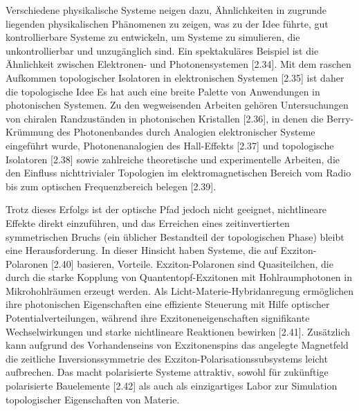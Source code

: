 \documentclass[
aps,
prl,
groupedaddress,
superscriptaddress,
floatfix,
notitlepage
]{revtex4-1}
\begin{document}
Verschiedene physikalische Systeme neigen dazu, Ähnlichkeiten in zugrunde liegenden physikalischen Phänomenen zu zeigen, was zu der Idee führte, gut kontrollierbare Systeme zu entwickeln, um Systeme zu simulieren, die unkontrollierbar und unzugänglich sind.
Ein spektakuläres Beispiel ist die Ähnlichkeit zwischen Elektronen- und Photonensystemen [2.34].
Mit dem raschen Aufkommen topologischer Isolatoren in elektronischen Systemen [2.35] ist daher die topologische Idee
Es hat auch eine breite Palette von Anwendungen in photonischen Systemen. Zu den wegweisenden Arbeiten gehören
Untersuchungen von chiralen Randzuständen in photonischen Kristallen [2.36], in denen die Berry-Krümmung des Photonenbandes durch Analogien elektronischer Systeme eingeführt wurde, Photonenanalogien des Hall-Effekts [2.37] und topologische Isolatoren [2.38] sowie zahlreiche theoretische und experimentelle Arbeiten, die den Einfluss nichttrivialer Topologien im elektromagnetischen Bereich vom Radio bis zum optischen Frequenzbereich belegen [2.39].

Trotz dieses Erfolgs ist der optische Pfad jedoch nicht geeignet, nichtlineare Effekte direkt einzuführen, und das Erreichen eines zeitinvertierten symmetrischen Bruchs (ein üblicher Bestandteil der topologischen Phase) bleibt eine Herausforderung.
In dieser Hinsicht haben Systeme, die auf Exziton-Polaronen [2.40] basieren, Vorteile. Exziton-Polaronen sind Quasiteilchen, die durch die starke Kopplung von Quantentopf-Exzitonen mit Hohlraumphotonen in Mikrohohlräumen erzeugt werden.
Als Licht-Materie-Hybridanregung ermöglichen ihre photonischen Eigenschaften eine effiziente Steuerung mit Hilfe optischer Potentialverteilungen, während ihre Exzitoneneigenschaften signifikante Wechselwirkungen und starke nichtlineare Reaktionen bewirken [2.41].
Zusätzlich kann aufgrund des Vorhandenseins von Exzitonenspins das angelegte Magnetfeld die zeitliche Inversionssymmetrie des Exziton-Polarisationssubsystems leicht aufbrechen. Das macht polarisierte Systeme attraktiv, sowohl für zukünftige polarisierte Bauelemente [2.42] als auch als einzigartiges Labor zur Simulation topologischer Eigenschaften von Materie.
\end{document}

